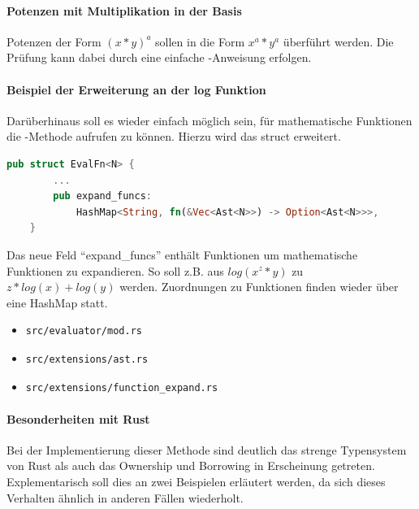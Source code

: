 \documentclass[11pt,a4paper, ngerman]{article}
\begin{document}
\paragraph{Potenzen mit Multiplikation in der Basis} Potenzen der Form $(x*y)^a$ sollen in die Form $x^a*y^a$ überführt werden. Die Prüfung kann dabei durch eine einfache -Anweisung erfolgen.

\paragraph{Beispiel der Erweiterung an der log Funktion} Darüberhinaus soll es wieder einfach möglich sein, für mathematische Funktionen die -Methode aufrufen zu können. Hierzu wird das struct  erweitert.

\begin{lstlisting}[language=rust, caption={EvalFn nach expand}]
    pub struct EvalFn<N> {
        ...
        pub expand_funcs: 
            HashMap<String, fn(&Vec<Ast<N>>) -> Option<Ast<N>>>,
    }
\end{lstlisting}

Das neue Feld ``expand\_funcs'' enthält Funktionen um mathematische Funktionen zu expandieren. So soll z.B. aus $log(x^z*y)$ zu $z*log(x)+log(y)$ werden. Zuordnungen zu Funktionen finden wieder über eine HashMap statt.

\begin{itemize}
    \item \begin{verbatim}src/evaluator/mod.rs\end{verbatim}
    \item \begin{verbatim}src/extensions/ast.rs\end{verbatim}
    \item \begin{verbatim}src/extensions/function_expand.rs\end{verbatim}
\end{itemize}

\paragraph{Besonderheiten mit Rust} Bei der Implementierung dieser Methode sind deutlich das strenge Typensystem von Rust als auch das Ownership und Borrowing in Erscheinung getreten. Explementarisch soll dies an zwei Beispielen erläutert werden, da sich dieses Verhalten ähnlich in anderen Fällen wiederholt.
\end{document}
